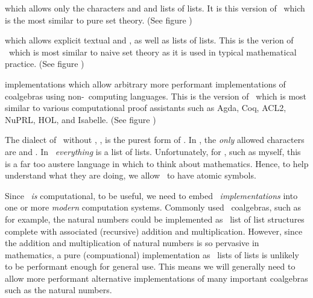 \startitemize[1]

\item {} which allows only the characters \quote{(} 
and \quote{)} and lists of lists. It is this version of \joylol\ which is 
the most similar to pure set theory. (See figure ) 

\item {} which allows explicit textual  
and , as well as lists of lists. This is the verion 
of \joylol\ which is most similar to naive set theory as it is used in 
typical mathematical practice. (See figure ) 

\item {} implementations which allow arbitrary 
more performant implementations of coalgebras using non-\joylol\ computing 
languages. This is the version of \joylol\ which is most similar to 
various computational proof assistants such as Agda, Coq, ACL2, NuPRL, 
HOL, and Isabelle. (See figure ) 

\stopitemize 

The dialect of \joylol\ without , \joylolZero, is the 
purest form of \joylol. In \joylolZero, the \emph{only} allowed characters 
are \quote{(} and \quote{)}. In \joylolZero\ \emph{everything} is a list 
of lists. Unfortunately, for , such as 
myself, this is a far too austere language in which to think about 
mathematics. Hence, to help  understand what 
they are doing, we allow \joylol\ to have atomic symbols. 

Since \joylol\ \emph{is} computational, to be useful, we need to embed 
\joylol\ \emph{implementations} into one or more \emph{modern} computation 
systems. Commonly used \joylol\ coalgebras, such as for example, the 
natural numbers could be implemented as \joylolZero\ list of list 
structures complete with associated (recursive) addition and 
multiplication. However, since the addition and multiplication of natural 
numbers is so pervasive in mathematics, a pure (compuational) 
implementation as \joylolZero\ lists of lists is unlikely to be performant 
enough for general use. This means we will generally need to allow more 
performant alternative implementations of many important coalgebras such 
as the natural numbers. 

